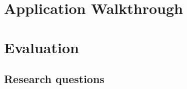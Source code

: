 \documentclass[a4paper,12pt,oneside]{book}
\begin{document}
\chapter{Application Walkthrough}




\chapter{Evaluation}
\section{Research questions}





\end{document}
